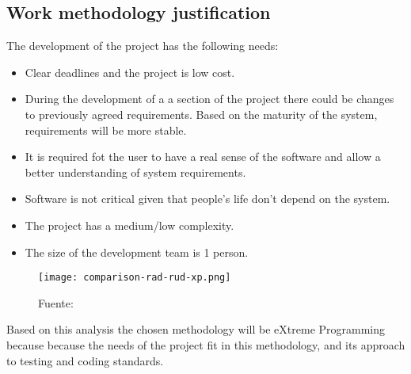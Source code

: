 \subsection{Work methodology justification}
\label{sec:methodology-justification}

The development of the project has the following needs:

\begin{itemize}
    \item Clear deadlines and the project is low cost.
    \item During the development of a a section of the project there could be changes to previously agreed requirements.
        Based on the maturity of the system, requirements will be more stable.
    \item It is required fot the  user to have a real sense of the software and allow a better understanding of system requirements.
    \item Software is not critical given that people's life don't depend on the system.
    \item The project has a medium/low complexity.
    \item The size of the development team is 1 person.
\end{itemize}

\begin{figure}
    \texttt{[image: comparison-rad-rud-xp.png]}
    \caption{Fuente: \textcite{geambasu2011influence}}
    \label{fig:comparison-rad-rud-xp}
\end{figure}

Based on this analysis the chosen methodology will be eXtreme Programming because because the needs of the project fit in this methodology, and its approach to testing and coding standards.

